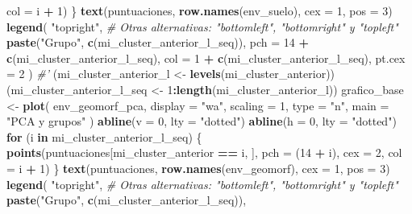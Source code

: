 \documentclass[11pt,]{article}
\newenvironment{Shaded}{\begin{snugshade}}{\end{snugshade}}
\newcommand{\KeywordTok}[1]{\textcolor[rgb]{0.13,0.29,0.53}{\textbf{#1}}}
\newcommand{\DataTypeTok}[1]{\textcolor[rgb]{0.13,0.29,0.53}{#1}}
\newcommand{\DecValTok}[1]{\textcolor[rgb]{0.00,0.00,0.81}{#1}}
\newcommand{\StringTok}[1]{\textcolor[rgb]{0.31,0.60,0.02}{#1}}
\newcommand{\CommentTok}[1]{\textcolor[rgb]{0.56,0.35,0.01}{\textit{#1}}}
\newcommand{\ControlFlowTok}[1]{\textcolor[rgb]{0.13,0.29,0.53}{\textbf{#1}}}
\newcommand{\OperatorTok}[1]{\textcolor[rgb]{0.81,0.36,0.00}{\textbf{#1}}}
\newcommand{\NormalTok}[1]{#1}
\begin{document}
\begin{Shaded}
\begin{Highlighting}[]
{{{{{{{{         \DataTypeTok{col =}\NormalTok{ i }\OperatorTok{+}\StringTok{ }\DecValTok{1}\NormalTok{)}
\NormalTok{\}}
\KeywordTok{text}\NormalTok{(puntuaciones, }\KeywordTok{row.names}\NormalTok{(env_suelo), }\DataTypeTok{cex =} \DecValTok{1}\NormalTok{, }\DataTypeTok{pos =} \DecValTok{3}\NormalTok{)}
\KeywordTok{legend}\NormalTok{(}
  \StringTok{"topright"}\NormalTok{, }\CommentTok{# Otras alternativas: "bottomleft", "bottomright" y "topleft"}
  \KeywordTok{paste}\NormalTok{(}\StringTok{"Grupo"}\NormalTok{, }\KeywordTok{c}\NormalTok{(mi_cluster_anterior_l_seq)),}
  \DataTypeTok{pch =} \DecValTok{14} \OperatorTok{+}\StringTok{ }\KeywordTok{c}\NormalTok{(mi_cluster_anterior_l_seq),}
  \DataTypeTok{col =} \DecValTok{1} \OperatorTok{+}\StringTok{ }\KeywordTok{c}\NormalTok{(mi_cluster_anterior_l_seq),}
  \DataTypeTok{pt.cex =} \DecValTok{2}
\NormalTok{)}
\CommentTok{#' }
\NormalTok{(mi_cluster_anterior_l <-}\StringTok{ }\KeywordTok{levels}\NormalTok{(mi_cluster_anterior))}
\NormalTok{(mi_cluster_anterior_l_seq <-}\StringTok{ }\DecValTok{1}\OperatorTok{:}\KeywordTok{length}\NormalTok{(mi_cluster_anterior_l))}
\NormalTok{grafico_base <-}\StringTok{ }\KeywordTok{plot}\NormalTok{(}
\NormalTok{  env_geomorf_pca,}
  \DataTypeTok{display =} \StringTok{"wa"}\NormalTok{,}
  \DataTypeTok{scaling =} \DecValTok{1}\NormalTok{,}
  \DataTypeTok{type =} \StringTok{"n"}\NormalTok{,}
  \DataTypeTok{main =} \StringTok{"PCA y grupos"}
\NormalTok{)}
\KeywordTok{abline}\NormalTok{(}\DataTypeTok{v =} \DecValTok{0}\NormalTok{, }\DataTypeTok{lty =} \StringTok{"dotted"}\NormalTok{)}
\KeywordTok{abline}\NormalTok{(}\DataTypeTok{h =} \DecValTok{0}\NormalTok{, }\DataTypeTok{lty =} \StringTok{"dotted"}\NormalTok{)}
\ControlFlowTok{for}\NormalTok{ (i }\ControlFlowTok{in}\NormalTok{ mi_cluster_anterior_l_seq) \{}
  \KeywordTok{points}\NormalTok{(puntuaciones[mi_cluster_anterior }\OperatorTok{==}\StringTok{ }\NormalTok{i, ],}
         \DataTypeTok{pch =}\NormalTok{ (}\DecValTok{14} \OperatorTok{+}\StringTok{ }\NormalTok{i),}
         \DataTypeTok{cex =} \DecValTok{2}\NormalTok{,}
         \DataTypeTok{col =}\NormalTok{ i }\OperatorTok{+}\StringTok{ }\DecValTok{1}\NormalTok{)}
\NormalTok{\}}
\KeywordTok{text}\NormalTok{(puntuaciones, }\KeywordTok{row.names}\NormalTok{(env_geomorf), }\DataTypeTok{cex =} \DecValTok{1}\NormalTok{, }\DataTypeTok{pos =} \DecValTok{3}\NormalTok{)}
\KeywordTok{legend}\NormalTok{(}
  \StringTok{"topright"}\NormalTok{, }\CommentTok{# Otras alternativas: "bottomleft", "bottomright" y "topleft"}
  \KeywordTok{paste}\NormalTok{(}\StringTok{"Grupo"}\NormalTok{, }\KeywordTok{c}\NormalTok{(mi_cluster_anterior_l_seq)),}
}}}}}}}}
\end{Highlighting}
\end{Shaded}
\end{document}
